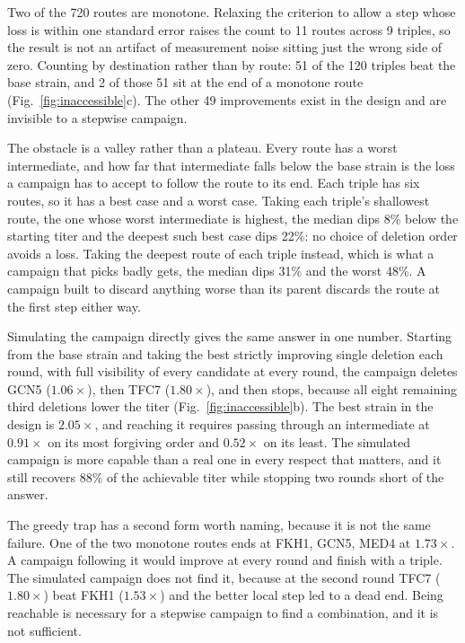 Two of the 720 routes are monotone. Relaxing the criterion to allow a step whose loss is
within one standard error raises the count to 11 routes across 9 triples, so the result is
not an artifact of measurement noise sitting just the wrong side of zero. Counting by
destination rather than by route: 51 of the 120 triples beat the base strain, and 2 of those
51 sit at the end of a monotone route (Fig.~\ref{fig:inaccessible}c). The other 49
improvements exist in the design and are invisible to a stepwise campaign.

The obstacle is a valley rather than a plateau. Every route has a worst intermediate, and
how far that intermediate falls below the base strain is the loss a campaign has to accept
to follow the route to its end. Each triple has six routes, so it has a best case and a
worst case. Taking each triple's shallowest route, the one whose worst intermediate is
highest, the median dips 8\% below the starting titer and the deepest such best case dips
22\%: no choice of deletion order avoids a loss. Taking the deepest route of each triple
instead, which is what a campaign that picks badly gets, the median dips 31\% and the
worst 48\%. A campaign built to discard anything worse than its parent discards the route
at the first step either way.

Simulating the campaign directly gives the same answer in one number. Starting from the base
strain and taking the best strictly improving single deletion each round, with full
visibility of every candidate at every round, the campaign deletes GCN5 ($1.06\times$), then
TFC7 ($1.80\times$), and then stops, because all eight remaining third deletions lower the
titer (Fig.~\ref{fig:inaccessible}b). The best strain in the design is $2.05\times$, and
reaching it requires passing through an intermediate at $0.91\times$ on its most forgiving
order and $0.52\times$ on its least. The simulated campaign is more capable than a real one
in every respect that matters, and it still recovers 88\% of the achievable titer while
stopping two rounds short of the answer.

The greedy trap has a second form worth naming, because it is not the same failure. One of
the two monotone routes ends at FKH1, GCN5, MED4 at $1.73\times$. A campaign following it
would improve at every round and finish with a triple. The simulated campaign does not find
it, because at the second round TFC7 ($1.80\times$) beat FKH1 ($1.53\times$) and the better
local step led to a dead end. Being reachable is necessary for a stepwise campaign to find a
combination, and it is not sufficient.


